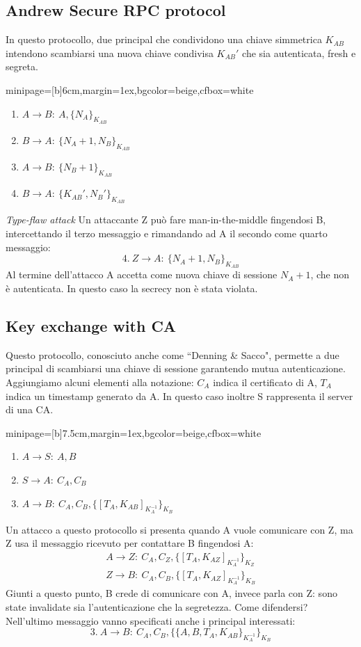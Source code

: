 \documentclass[a4paper, 11pt, twoside, openright, fleqn]{report}
\newcommand{\fromto}[2]{#1\rightarrow #2\!:\ }
\newenvironment{colbox}[2]%
{%
	\par\noindent\hspace{10pt}
	\begin{adjustbox}{minipage=[b]{#2},margin=1ex,bgcolor=#1,cfbox=white}
}{%
	\end{adjustbox}\newline%
}
\begin{document}
\subsection{Andrew Secure RPC protocol}
In questo protocollo, due principal che condividono una chiave simmetrica $K_{AB}$ intendono scambiarsi una nuova chiave condivisa $K_{AB}'$ che sia autenticata, fresh e segreta.
\begin{colbox}{beige}{6cm}
	\begin{enumerate}
		\item $\fromto{A}{B}A,\{N_A\}_{K_{AB}}$
		\item $\fromto{B}{A}\{N_A+1,N_B\}_{K_{AB}}$
		\item $\fromto{A}{B}\{N_B+1\}_{K_{AB}}$
		\item $\fromto{B}{A}\{K_{AB}',N_B'\}_{K_{AB}}$
	\end{enumerate}
\end{colbox}
\emph{Type-flaw attack}
Un attaccante Z può fare man-in-the-middle fingendosi B, intercettando il terzo messaggio e rimandando ad A il secondo come quarto messaggio:
\begin{equation*}
	4.\ \fromto{Z}{A}\{N_A+1,N_B\}_{K_{AB}}
\end{equation*}
Al termine dell'attacco A accetta come nuova chiave di sessione $N_A+1$, che non è autenticata. In questo caso la secrecy non è stata violata.

\subsection{Key exchange with CA}
Questo protocollo, conosciuto anche come ``Denning \& Sacco", permette a due principal di scambiarsi una chiave di sessione garantendo mutua autenticazione.\\
Aggiungiamo alcuni elementi alla notazione: $C_A$ indica il certificato di A, $T_A$ indica un timestamp generato da A. In questo caso inoltre S rappresenta il server di una CA.
\begin{colbox}{beige}{7.5cm}
	\begin{enumerate}
		\item $\fromto{A}{S}A,B$
		\item $\fromto{S}{A}C_A,C_B$
		\item $\fromto{A}{B}C_A,C_B,\{[T_A,K_{AB}]_{K_A^{-1}}\}_{K_B}$
	\end{enumerate}
\end{colbox}
Un attacco a questo protocollo si presenta quando A vuole comunicare con Z, ma Z usa il messaggio ricevuto per contattare B fingendosi A:
\begin{gather*}
	\fromto{A}{Z}C_A,C_Z,\{[T_A,K_{AZ}]_{K_A^{-1}}\}_{K_Z}\\
	\fromto{Z}{B}C_A,C_B,\{[T_A,K_{AZ}]_{K_A^{-1}}\}_{K_B}
\end{gather*}
Giunti a questo punto, B crede di comunicare con A, invece parla con Z: sono state invalidate sia l'autenticazione che la segretezza. Come difendersi?\\
Nell'ultimo messaggio vanno specificati anche i principal interessati:
\begin{equation*}
	3.\ \fromto{A}{B}C_A,C_B,\{\{A,B,T_A,K_{AB}\}_{K_A^{-1}}\}_{K_B}
\end{equation*}
\end{document}
